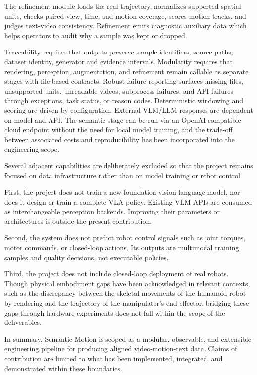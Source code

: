 \documentclass[11pt,oneside]{report}
\begin{document}
The refinement module loads the real trajectory, normalizes supported spatial units, checks paired-view, time, and motion coverage, scores motion tracks, and judges text-video consistency. Refinement emits diagnostic auxiliary data which helps operators to audit why a sample was kept or dropped.

Traceability requires that outputs preserve sample identifiers, source paths, dataset identity, generator and evidence intervals. Modularity requires that rendering, perception, augmentation, and refinement remain callable as separate stages with file-based contracts. Robust failure reporting surfaces missing files, unsupported units, unreadable videos, subprocess failures, and API failures through exceptions, task status, or reason codes. Deterministic windowing and scoring are driven by configuration. External VLM/LLM responses are dependent on model and API. The semantic stage can be run via an OpenAI-compatible cloud endpoint without the need for local model training, and the trade-off between associated costs and reproducibility has been incorporated into the engineering scope.

Several adjacent capabilities are deliberately excluded so that the project remains focused on data infrastructure rather than on model training or robot control.

First, the project does not train a new foundation vision-language model, nor does it design or train a complete VLA policy. Existing VLM APIs are consumed as interchangeable perception backends. Improving their parameters or architectures is outside the present contribution.

Second, the system does not predict robot control signals such as joint torques, motor commands, or closed-loop actions. Its outputs are multimodal training samples and quality decisions, not executable policies.

Third, the project does not include closed-loop deployment of real robots. Though physical embodiment gaps have been acknowledged in relevant contexts, such as the discrepancy between the skeletal movements of the humanoid robot by rendering and the trajectory of the manipulator’s end-effector, bridging these gaps through hardware experiments does not fall within the scope of the deliverables.

In summary, Semantic-Motion is scoped as a modular, observable, and extensible engineering pipeline for producing aligned video-motion-text data. Claims of contribution are limited to what has been implemented, integrated, and demonstrated within these boundaries.
\end{document}
